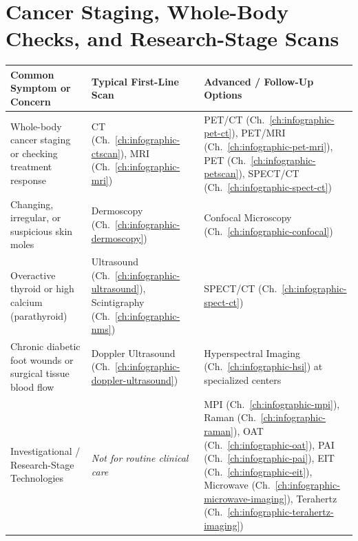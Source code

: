 \section{Cancer Staging, Whole-Body Checks, and Research-Stage Scans}
{\renewcommand{\arraystretch}{1.25}\noindent
\begin{tabularx}{\textwidth}{@{}p{} p{} X@{}}
\toprule
\textbf{Common Symptom or Concern} & \textbf{Typical First-Line Scan} & \textbf{Advanced / Follow-Up Options} \\
\midrule
Whole-body cancer staging or checking treatment response & CT (Ch.~\ref{ch:infographic-ctscan}), MRI (Ch.~\ref{ch:infographic-mri}) & PET/CT (Ch.~\ref{ch:infographic-pet-ct}), PET/MRI (Ch.~\ref{ch:infographic-pet-mri}), PET (Ch.~\ref{ch:infographic-petscan}), SPECT/CT (Ch.~\ref{ch:infographic-spect-ct}) \\
Changing, irregular, or suspicious skin moles & Dermoscopy (Ch.~\ref{ch:infographic-dermoscopy}) & Confocal Microscopy (Ch.~\ref{ch:infographic-confocal}) \\
Overactive thyroid or high calcium (parathyroid) & Ultrasound (Ch.~\ref{ch:infographic-ultrasound}), Scintigraphy (Ch.~\ref{ch:infographic-nms}) & SPECT/CT (Ch.~\ref{ch:infographic-spect-ct}) \\
Chronic diabetic foot wounds or surgical tissue blood flow & Doppler Ultrasound (Ch.~\ref{ch:infographic-doppler-ultrasound}) & Hyperspectral Imaging (Ch.~\ref{ch:infographic-hsi}) at specialized centers \\
Investigational / Research-Stage Technologies & \emph{Not for routine clinical care} & MPI (Ch.~\ref{ch:infographic-mpi}), Raman (Ch.~\ref{ch:infographic-raman}), OAT (Ch.~\ref{ch:infographic-oat}), PAI (Ch.~\ref{ch:infographic-pai}), EIT (Ch.~\ref{ch:infographic-eit}), Microwave (Ch.~\ref{ch:infographic-microwave-imaging}), Terahertz (Ch.~\ref{ch:infographic-terahertz-imaging}) \\
\bottomrule
\end{tabularx}}

